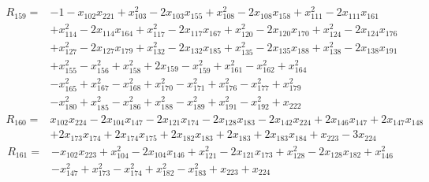 \[
\begin{aligned}
R_{159}={}&-1-x_{102}x_{221}+x_{103}^{2}-2x_{103}x_{155}+x_{108}^{2}-2x_{108}x_{158}+x_{111}^{2}-2x_{111}x_{161}\\
&+x_{114}^{2}-2x_{114}x_{164}+x_{117}^{2}-2x_{117}x_{167}+x_{120}^{2}-2x_{120}x_{170}+x_{124}^{2}-2x_{124}x_{176}\\
&+x_{127}^{2}-2x_{127}x_{179}+x_{132}^{2}-2x_{132}x_{185}+x_{135}^{2}-2x_{135}x_{188}+x_{138}^{2}-2x_{138}x_{191}\\
&+x_{155}^{2}-x_{156}^{2}+x_{158}^{2}+2x_{159}-x_{159}^{2}+x_{161}^{2}-x_{162}^{2}+x_{164}^{2}\\
&-x_{165}^{2}+x_{167}^{2}-x_{168}^{2}+x_{170}^{2}-x_{171}^{2}+x_{176}^{2}-x_{177}^{2}+x_{179}^{2}\\
&-x_{180}^{2}+x_{185}^{2}-x_{186}^{2}+x_{188}^{2}-x_{189}^{2}+x_{191}^{2}-x_{192}^{2}+x_{222}
\end{aligned}
\]
\[
\begin{aligned}
R_{160}={}&x_{102}x_{224}-2x_{104}x_{147}-2x_{121}x_{174}-2x_{128}x_{183}-2x_{142}x_{224}+2x_{146}x_{147}+2x_{147}x_{148}\\
&+2x_{173}x_{174}+2x_{174}x_{175}+2x_{182}x_{183}+2x_{183}+2x_{183}x_{184}+x_{223}-3x_{224}
\end{aligned}
\]
\[
\begin{aligned}
R_{161}={}&-x_{102}x_{223}+x_{104}^{2}-2x_{104}x_{146}+x_{121}^{2}-2x_{121}x_{173}+x_{128}^{2}-2x_{128}x_{182}+x_{146}^{2}\\
&-x_{147}^{2}+x_{173}^{2}-x_{174}^{2}+x_{182}^{2}-x_{183}^{2}+x_{223}+x_{224}
\end{aligned}
\]
\endgroup
